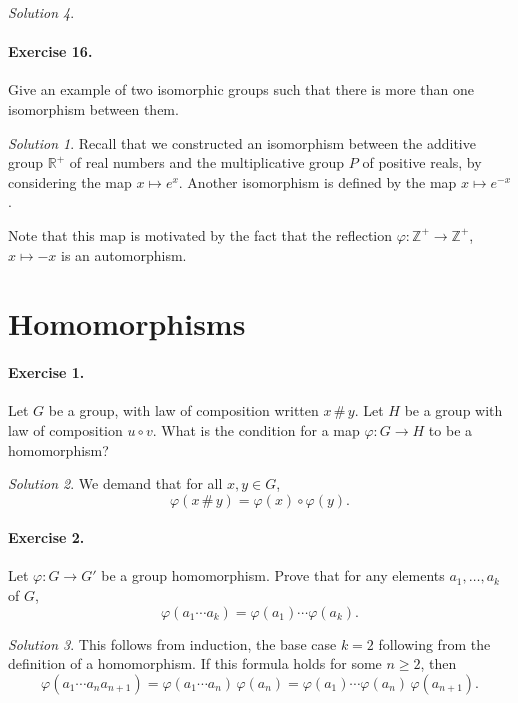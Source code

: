 \documentclass[11pt]{report}
\def\R{\mathbb{R}}
\def\Z{\mathbb{Z}}
\theoremstyle{remark}
\newtheorem*{solution}{Solution}
\begin{document}
\begin{solution}
    \paragraph{Exercise 16.} Give an example of two isomorphic groups such that
    there is more than one isomorphism between them.   
    \begin{solution}
        Recall that we constructed an isomorphism between the additive group $\R^+$
        of real numbers and the multiplicative group $P$ of positive reals, by
        considering the map $x \mapsto e^{x}$. Another isomorphism is defined by the
        map $x \mapsto e^{-x}$.


        Note that this map is motivated by the fact that the reflection
        $\varphi\colon \Z^{+} \to \Z^{+}$, $x \mapsto -x$ is an automorphism.
    \end{solution}


    \section{Homomorphisms}
    
    \paragraph{Exercise 1.} Let $G$ be a group, with law of composition written $x
    \,\#\, y$. Let $H$ be a group with law of composition $u \circ v$. What is the
    condition for a map $\varphi\colon G \to H$ to be a homomorphism?
    \begin{solution}
        We demand that for all $x, y \in G$, \[
            \varphi(x \,\#\, y) = \varphi(x) \circ \varphi(y).
        \] 
    \end{solution}

    \paragraph{Exercise 2.} Let $\varphi\colon G \to G'$ be a group homomorphism.
    Prove that for any elements $a_1, \dots, a_k$ of $G$, \[
        \varphi(a_1\cdots a_k) = \varphi(a_1)\cdots \varphi(a_k).
    \] 
    \begin{solution}
        This follows from induction, the base case $k = 2$ following from the
        definition of a homomorphism. If this formula holds for some $n \geq 2$,
        then \[
            \varphi(a_1\cdots a_n a_{n + 1}) = \varphi(a_1\cdots a_n)\,\varphi(a_n) =
            \varphi(a_1)\cdots \varphi(a_n)\,\varphi(a_{n + 1}).
        \] 
    \end{solution}


\end{solution}
\end{document}
